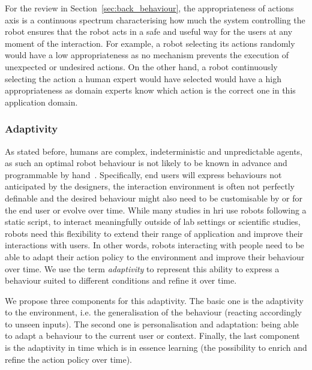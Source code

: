     For the review in Section~\ref{sec:back_behaviour}, the appropriateness of actions axis is a continuous spectrum characterising how much the system controlling the robot ensures that the robot acts in a safe and useful way for the users at any moment of the interaction. For example, a robot selecting its actions randomly would have a low appropriateness as no mechanism prevents the execution of unexpected or undesired actions. On the other hand, a robot continuously selecting the action a human expert would have selected would have a high appropriateness as domain experts know which action is the correct one in this application domain.


\subsubsection{Adaptivity}	\label{ssec:adap}
    As stated before, humans are complex, indeterministic and unpredictable agents, as such an optimal robot behaviour is not likely to be known in advance and programmable by hand~\citep{dautenhahn2004robots,argall2009survey}. Specifically, end users will express behaviours not anticipated by the designers, the interaction environment is often not perfectly definable and the desired behaviour might also need to be customisable by or for the end user or evolve over time. While many studies in \gls{hri} use robots following a static script, to interact meaningfully outside of lab settings or scientific studies, robots need this flexibility to extend their range of application and improve their interactions with users. In other words, robots interacting with people need to be able to adapt their action policy to the environment and improve their behaviour over time. We use the term \emph{adaptivity} to represent this ability to express a behaviour suited to different conditions and refine it over time. 
    
    We propose three components for this adaptivity. The basic one is the adaptivity to the environment, i.e. the generalisation of the behaviour (reacting accordingly to unseen inputs). The second one is personalisation and adaptation: being able to adapt a behaviour to the current user or context. Finally, the last component is the adaptivity in time which is in essence learning (the possibility to enrich and refine the action policy over time). 
       
